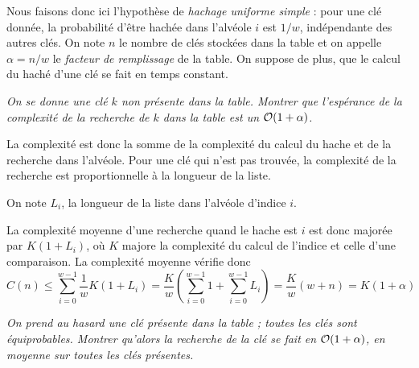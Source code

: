 Nous faisons donc ici l’hypothèse de {\em hachage uniforme simple} : pour
une clé donnée, la probabilité d’être hachée dans l’alvéole $i$ est
$1/w$, indépendante des autres clés. On note $n$ le
nombre de clés stockées dans la table et on appelle $\alpha=n/w$ le
{\em facteur de remplissage} de la table. On
suppose de plus, que le calcul du haché d’une clé se fait
en temps constant.
\begin{Exercise}\it
On se donne une clé $k$ non présente dans la table. Montrer que
l’espérance de la complexité de la recherche de $k$ dans la table est un
${\cal O}(1+\alpha)$.
\end{Exercise}
\begin{Answer}La complexité est donc la somme de la complexité du calcul du hache et de la recherche dans l'alvéole. Pour une clé qui n'est pas trouvée, la complexité de la recherche est proportionnelle à la longueur de la liste.

On note $L_i$, la longueur de la liste dans l'alvéole d'indice $i$.

La complexité moyenne d'une recherche quand le hache est $i$ est donc majorée par $K(1+L_i)$, où $K$ majore la complexité du calcul de l'indice  et celle d'une comparaison.
La complexité moyenne vérifie donc 
\[C(n) \le \sum_{i=0}^{w-1}\frac 1w K(1+L_i)
=\frac Kw\left(\sum_{i=0}^{w-1}1+\sum_{i=0}^{w-1}L_i\right)
=\frac Kw\left(w+n\right) = K(1+\alpha)\]
\end{Answer}
\begin{Exercise}\it
On prend au hasard une clé présente dans la table ; toutes les clés sont
équiprobables. Montrer qu’alors la recherche de la clé se fait en
${\cal O}(1+\alpha)$, en moyenne sur toutes les clés présentes.
\end{Exercise}
